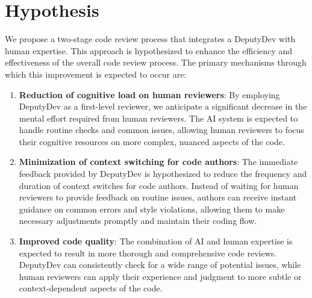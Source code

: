 \section{Hypothesis}
We propose a two-stage code review process that integrates a DeputyDev with human expertise. This approach is hypothesized to enhance the efficiency and effectiveness of the overall code review process. The primary mechanisms through which this improvement is expected to occur are:

\begin{enumerate}
    \item \textbf{Reduction of cognitive load on human reviewers}: By employing DeputyDev as a first-level reviewer, we anticipate a significant decrease in the mental effort required from human reviewers. The AI system is expected to handle routine checks and common issues, allowing human reviewers to focus their cognitive resources on more complex, nuanced aspects of the code.
    
    \item \textbf{Minimization of context switching for code authors}: The immediate feedback provided by DeputyDev is hypothesized to reduce the frequency and duration of context switches for code authors. Instead of waiting for human reviewers to provide feedback on routine issues, authors can receive instant guidance on common errors and style violations, allowing them to make necessary adjustments promptly and maintain their coding flow.
    
    \item \textbf{Improved code quality}: The combination of AI and human expertise is expected to result in more thorough and comprehensive code reviews. DeputyDev can consistently check for a wide range of potential issues, while human reviewers can apply their experience and judgment to more subtle or context-dependent aspects of the code.
\end{enumerate}